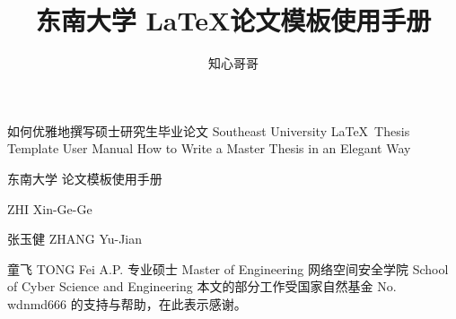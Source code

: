 \documentclass[algorithmlist,figurelist,tablelist,nomlist]{template/seumasterthesis}
\begin{document}

\title
    {东南大学 \LaTeX 论文模板使用手册}        %
    {如何优雅地撰写硕士研究生毕业论文}         %
    {Southeast University \LaTeX ~Thesis Template User Manual}  %
    {How to Write a Master Thesis in an Elegant Way}            %

\spine
    {东南大学  论文模板使用手册} 
    {}                                                               

\author
    {知心哥哥}                        %
    {ZHI Xin-Ge-Ge}                  %

\advisor
    {张玉健}                %
    {ZHANG Yu-Jian}        %
    {}                     %
    
\coadvisor                 %
    {童飞}                  %
    {TONG Fei}             %
    {A.P.}                 %
\degreetype                        %
    {专业硕士}
    {Master of Engineering}
{}       %
\committeechair{}               %
\reviewer{}{}            %
\department                        %
    {网络空间安全学院}
    {School of Cyber Science and Engineering}
\seuthesisthanks                %
    {本文的部分工作受国家自然基金 No. wdnmd666 的支持与帮助，在此表示感谢。}
\end{document}
